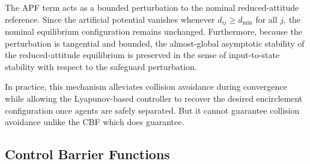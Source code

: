 The APF term acts as a bounded perturbation to the nominal
reduced-attitude reference. Since the artificial potential vanishes
whenever $d_{ij} \ge d_{\min}$ for all $j$, the nominal equilibrium
configuration remains unchanged. Furthermore, because the perturbation
is tangential and bounded, the almost-global asymptotic stability of
the reduced-attitude equilibrium is preserved in the sense of
input-to-state stability with respect to the safeguard perturbation.

In practice, this mechanism alleviates collision avoidance during
convergence while allowing the Lyapunov-based controller to recover
the desired encirclement configuration once agents are safely
separated. But it cannot guarantee collision avoidance unlike the \gls{CBF} which does guarantee.

\subsection{Control Barrier Functions}
